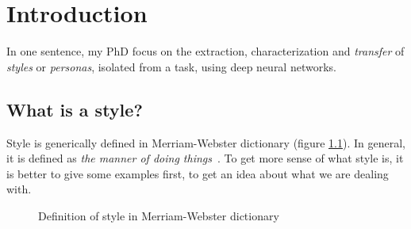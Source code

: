\chapter{Introduction}
\minitoc%

\par In one sentence, my PhD focus on the extraction, characterization and \textit{transfer} of \textit{styles} or \textit{personas}, isolated from a task, using deep neural networks.

\section{What is a style?}\label{sec:style}
  \par Style is generically defined in Merriam-Webster dictionary (figure \ref{fig:style_def_webster}). In general, it is defined as \textit{the manner of doing things}~\citep{gallaher1992individual}. To get more sense of what style is, it is better to give some examples first, to get an idea about what we are dealing with.

  \begin{figure}[!htbp]
    \centering
    \caption{Definition of style in Merriam-Webster dictionary}
    \label{fig:style_def_webster}
  \end{figure}

